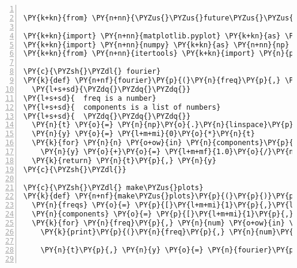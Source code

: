\begin{Verbatim}[commandchars=\\\{\},numbers=left,numbersep=0.5em]
 
\PY{k+kn}{from} \PY{n+nn}{\PYZus{}\PYZus{}future\PYZus{}\PYZus{}} \PY{k+kn}{import} \PY{n}{print\PYZus{}function}

\PY{k+kn}{import} \PY{n+nn}{matplotlib.pyplot} \PY{k+kn}{as} \PY{n+nn}{plt}
\PY{k+kn}{import} \PY{n+nn}{numpy} \PY{k+kn}{as} \PY{n+nn}{np}
\PY{k+kn}{from} \PY{n+nn}{itertools} \PY{k+kn}{import} \PY{n}{product}

\PY{c}{\PYZsh{}\PYZdl{} fourier}
\PY{k}{def} \PY{n+nf}{fourier}\PY{p}{(}\PY{n}{freq}\PY{p}{,} \PY{n}{components}\PY{p}{,} \PY{n}{tlims}\PY{o}{=}\PY{p}{[}\PY{l+m+mi}{0}\PY{p}{,}\PY{l+m+mi}{1}\PY{p}{]}\PY{p}{)}\PY{p}{:}
  \PY{l+s+sd}{\PYZdq{}\PYZdq{}\PYZdq{}}
\PY{l+s+sd}{  freq is a number}
\PY{l+s+sd}{  components is a list of numbers}
\PY{l+s+sd}{  \PYZdq{}\PYZdq{}\PYZdq{}}
  \PY{n}{t} \PY{o}{=} \PY{n}{np}\PY{o}{.}\PY{n}{linspace}\PY{p}{(}\PY{o}{*}\PY{n}{tlims}\PY{p}{,} \PY{n}{num}\PY{o}{=}\PY{l+m+mi}{1000}\PY{p}{)}
  \PY{n}{y} \PY{o}{=} \PY{l+m+mi}{0}\PY{o}{*}\PY{n}{t}
  \PY{k}{for} \PY{n}{n} \PY{o+ow}{in} \PY{n}{components}\PY{p}{:}
    \PY{n}{y} \PY{o}{+}\PY{o}{=} \PY{l+m+mf}{1.0}\PY{o}{/}\PY{n}{n} \PY{o}{*} \PY{n}{np}\PY{o}{.}\PY{n}{sin}\PY{p}{(}\PY{l+m+mi}{2}\PY{o}{*}\PY{n}{np}\PY{o}{.}\PY{n}{pi}\PY{o}{*}\PY{p}{(}\PY{n}{freq}\PY{o}{*}\PY{n}{n}\PY{p}{)}\PY{o}{*}\PY{n}{t}\PY{p}{)}
  \PY{k}{return} \PY{n}{t}\PY{p}{,} \PY{n}{y}
\PY{c}{\PYZsh{}\PYZdl{}}

\PY{c}{\PYZsh{}\PYZdl{} make\PYZus{}plots}
\PY{k}{def} \PY{n+nf}{make\PYZus{}plots}\PY{p}{(}\PY{p}{)}\PY{p}{:}
  \PY{n}{freqs} \PY{o}{=} \PY{p}{[}\PY{l+m+mi}{1}\PY{p}{,}\PY{l+m+mi}{2}\PY{p}{,}\PY{l+m+mi}{3}\PY{p}{,}\PY{l+m+mi}{4}\PY{p}{,}\PY{l+m+mi}{5}\PY{p}{]}
  \PY{n}{components} \PY{o}{=} \PY{p}{[}\PY{l+m+mi}{1}\PY{p}{,}\PY{l+m+mi}{3}\PY{p}{,}\PY{l+m+mi}{5}\PY{p}{,}\PY{l+m+mi}{7}\PY{p}{,}\PY{l+m+mi}{9}\PY{p}{]}
  \PY{k}{for} \PY{n}{freq}\PY{p}{,} \PY{n}{num} \PY{o+ow}{in} \PY{n}{product}\PY{p}{(}\PY{n}{freqs}\PY{p}{,} \PY{n+nb}{range}\PY{p}{(}\PY{l+m+mi}{1}\PY{p}{,}\PY{l+m+mi}{6}\PY{p}{)}\PY{p}{)}\PY{p}{:}
    \PY{k}{print}\PY{p}{(}\PY{n}{freq}\PY{p}{,} \PY{n}{num}\PY{p}{)}
    
    \PY{n}{t}\PY{p}{,} \PY{n}{y} \PY{o}{=} \PY{n}{fourier}\PY{p}{(}\PY{n}{freq}\PY{p}{,} \PY{n}{components}\PY{p}{[}\PY{p}{:}\PY{n}{num}\PY{p}{]}\PY{p}{)}
    

\end{Verbatim}
